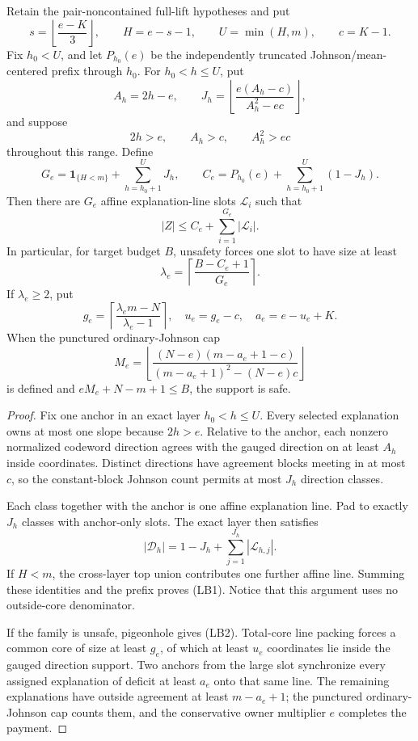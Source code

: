 \documentclass[11pt,a4paper]{amsart}
\numberwithin{equation}{section}
\theoremstyle{remark}
\begin{document}
\begin{corollary}
\label{cor:full-lift-boundary-line-bank}
Retain the pair-noncontained full-lift hypotheses and put
\[
 s=\left\lfloor\frac{e-K}{3}\right\rfloor,\qquad
 H=e-s-1,\qquad U=\min(H,m),\qquad c=K-1.
\]
Fix \(h_0<U\), and let \(P_{h_0}(e)\) be the independently truncated
Johnson/mean-centered prefix through \(h_0\).  For
\(h_0<h\le U\), put
\[
 A_h=2h-e,\qquad
 J_h=\left\lfloor\frac{e(A_h-c)}{A_h^2-ec}\right\rfloor,
\]
and suppose
\[
 2h>e,\qquad A_h>c,\qquad A_h^2>ec
\]
throughout this range.  Define
\[
 G_e=\mathbf 1_{\{H<m\}}+\sum_{h=h_0+1}^{U}J_h,\qquad
 C_e=P_{h_0}(e)+\sum_{h=h_0+1}^{U}(1-J_h).
\]
Then there are \(G_e\) affine explanation-line slots
\(\mathcal L_i\) such that
\[
 |Z|\le C_e+\sum_{i=1}^{G_e}|\mathcal L_i|.        \tag{LB1}
\]
In particular, for target budget \(B\), unsafety forces one slot to
have size at least
\[
 \lambda_e=
 \left\lceil\frac{B-C_e+1}{G_e}\right\rceil.       \tag{LB2}
\]
If \(\lambda_e\ge2\), put
\[
 g_e=\left\lceil\frac{\lambda_em-N}{\lambda_e-1}\right\rceil,
 \quad u_e=g_e-c,\quad a_e=e-u_e+K.
\]
When the punctured ordinary-Johnson cap
\[
 M_e=\left\lfloor
 \frac{(N-e)(m-a_e+1-c)}
 {(m-a_e+1)^2-(N-e)c}
 \right\rfloor
\]
is defined and \(eM_e+N-m+1\le B\), the support is safe.
\end{corollary}

\begin{proof}
Fix one anchor in an exact layer \(h_0<h\le U\).  Every selected
explanation owns at most one slope because \(2h>e\).  Relative to the
anchor, each nonzero normalized codeword direction agrees with the gauged
direction on at least \(A_h\) inside coordinates.  Distinct directions
have agreement blocks meeting in at most \(c\), so the constant-block
Johnson count permits at most \(J_h\) direction classes.

Each class together with the anchor is one affine explanation line.  Pad
to exactly \(J_h\) classes with anchor-only slots.  The exact layer then
satisfies
\[
 |\mathcal D_h|
 =1-J_h+\sum_{j=1}^{J_h}|\mathcal L_{h,j}|.
\]
If \(H<m\), the cross-layer top union contributes one further affine line.
Summing these identities and the prefix proves (LB1).  Notice that this
argument uses no outside-core denominator.

If the family is unsafe, pigeonhole gives (LB2).  Total-core line packing
forces a common core of size at least \(g_e\), of which at least \(u_e\)
coordinates lie inside the gauged direction support.  Two anchors from
the large slot synchronize every assigned explanation of deficit at least
\(a_e\) onto that same line.  The remaining explanations have outside
agreement at least \(m-a_e+1\); the punctured ordinary-Johnson cap counts
them, and the conservative owner multiplier \(e\) completes the payment.
\end{proof}
\end{document}
